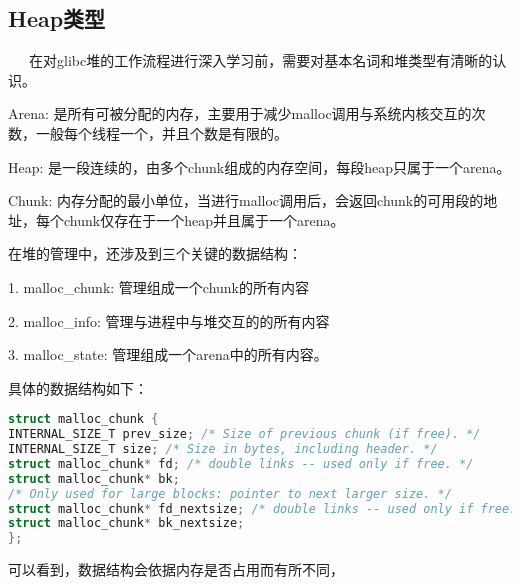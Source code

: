 \documentclass[12pt]{article}  %
\begin{document}
\subsection{Heap类型}
\ \ \ 在对glibc堆的工作流程进行深入学习前，需要对基本名词和堆类型有清晰的认识。\par
Arena: 是所有可被分配的内存，主要用于减少malloc调用与系统内核交互的次数，一般每个线程一个，并且个数是有限的。\par
Heap: 是一段连续的，由多个chunk组成的内存空间，每段heap只属于一个arena。\par
Chunk: 内存分配的最小单位，当进行malloc调用后，会返回chunk的可用段的地址，每个chunk仅存在于一个heap并且属于一个arena。\par
在堆的管理中，还涉及到三个关键的数据结构：\par
1. malloc\_chunk: 管理组成一个chunk的所有内容\par
2. malloc\_info:  管理与进程中与堆交互的的所有内容\par
3. malloc\_state: 管理组成一个arena中的所有内容。\par
具体的数据结构如下：
\begin{lstlisting}[language=c]
struct malloc_chunk {
INTERNAL_SIZE_T prev_size; /* Size of previous chunk (if free). */
INTERNAL_SIZE_T size; /* Size in bytes, including header. */
struct malloc_chunk* fd; /* double links -- used only if free. */
struct malloc_chunk* bk;
/* Only used for large blocks: pointer to next larger size. */
struct malloc_chunk* fd_nextsize; /* double links -- used only if free. */
struct malloc_chunk* bk_nextsize;
};
\end{lstlisting}\par
可以看到，数据结构会依据内存是否占用而有所不同，

\begin{lstlisting}[language=c]

\end{lstlisting}
\begin{lstlisting}[language=c]

\end{lstlisting}
\begin{lstlisting}[language=c]

\end{lstlisting}
\begin{lstlisting}[language=c]

\end{lstlisting}
\end{document}

